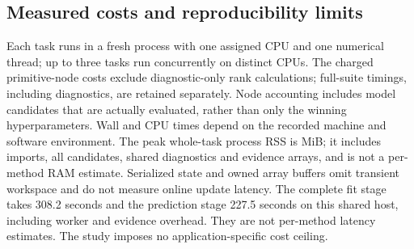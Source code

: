 \begin{table}[!htbp]
\centering\small
\setlength{\tabcolsep}{8pt}
\caption{Whole-procedure choices made by the C-selected non-KAHM policy.
Each task contributes one choice across all horizons after each candidate's
own horizon-wise C mixing selection. Both KAHM arms are excluded. These are
validation choices, not choices made from D errors.}
\label{tab:mechanism-policy}

\end{table}

\subsection{Measured costs and reproducibility limits}

\begin{table}[!htbp]
\centering\small
\setlength{\tabcolsep}{4pt}
\caption{Mean charged resources over all 192 equal-sized task suites.
Fitting and selection include required A fitting, B selection and C calibration.
Dimension-selected procedures pay for all six native cap candidates.
Shared computation nodes are charged once to every procedure requiring
them; policy fitting pays the union of its non-KAHM candidates. State
denotes the pruned selected deployment object, while arrays count its
owned NumPy buffers. The final two rows give fixed-cap KAHM controls.
These are descriptive implementation costs, not isolated speed benchmarks
or minimum deployment complexity.}
\label{tab:mechanism-resources}

\end{table}

Each task runs in a fresh process with one assigned CPU and one numerical
thread; up to three tasks run concurrently on distinct CPUs. The charged
primitive-node costs exclude diagnostic-only
rank calculations; full-suite timings, including diagnostics, are retained
separately. Node accounting includes model candidates that are actually
evaluated, rather than only the winning hyperparameters. Wall and CPU times
depend on the recorded machine and software environment. The peak whole-task
process RSS is \DFPeakProcessMiB{} MiB; it includes imports, all candidates,
shared diagnostics and evidence arrays, and is not a per-method RAM estimate.
Serialized state and owned array buffers omit transient workspace and do not
measure online update latency. The complete fit stage takes 308.2 seconds
and the prediction stage 227.5 seconds on this shared host, including
worker and evidence overhead. They are not per-method latency estimates.
The study imposes no application-specific cost ceiling.

